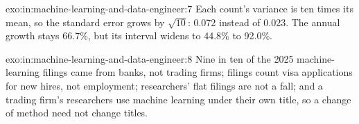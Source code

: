 \begin{solution}{exo:in:machine-learning-and-data-engineer:7}
Each count's variance is ten times its mean, so the standard error grows by $\sqrt{10}$: 0.072 instead of 0.023. The
annual growth stays 66.7\%, but its interval widens to 44.8\% to 92.0\%.
\end{solution}

\begin{solution}{exo:in:machine-learning-and-data-engineer:8}
Nine in ten of the 2025 machine-learning filings came from banks, not trading firms; filings count visa applications for
new hires, not employment; researchers' flat filings are not a fall; and a trading firm's researchers use machine learning
under their own title, so a change of method need not change titles.
\end{solution}

